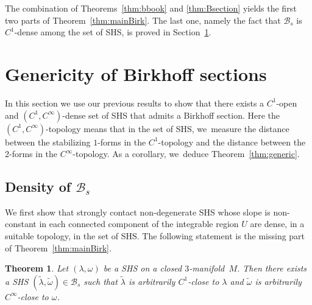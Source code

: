 \documentclass[JEP,XML,SOM,Unicode,NoEqCountersInSection,NoFloatCountersInSection,published]{cedram}
\newcommand{\threemanifold}{$3$\nobreakdash-mani\-fold\xspace}
\newtheorem{theorem}{Theorem}[section]
\theoremstyle{definition}
\begin{document}
The combination of Theorems~\ref{thm:bbook} and \ref{thm:Bsection} yields the first two parts of Theorem~\ref{thm:mainBirk}. The last one, namely the fact that $\mathcal{B}_s$ is $C^1$-dense among the set of SHS, is proved in Section~\ref{sec:gen}.\enlargethispage{.5\baselineskip}%

\section{Genericity of Birkhoff sections}\label{sec:gen}

In this section we use our previous results to show that there exists a $C^1$-open and $(C^1,C^\infty)$-dense set of SHS that admits a Birkhoff section. Here the $(C^1,C^\infty)$-topology means that in the set of SHS, we~measure the distance between the stabilizing $1$-forms in the $C^1$-topology and the distance between the 2-forms in the $C^\infty$-topology. As a corollary, we~deduce Theorem~\ref{thm:generic}.

\subsection{Density of $\mathcal{B}_s$
}\label{ss:density}

We first show that strongly contact non-degenerate SHS whose slope is non-constant in each connected component of the integrable region $U$ are dense, in a suitable topology, in the set of SHS. The following statement is the missing part of Theorem~\ref{thm:mainBirk}.

\begin{theorem}\label{thm:density}
Let $(\lambda,\omega)$ be a SHS on a closed \threemanifold~$M$. Then there exists a SHS $(\widetilde \lambda, \widetilde \omega) \in \mathcal{B}_s$ such that $\widetilde \lambda$ is arbitrarily $C^1$-close to $\lambda$ and $\widetilde \omega$ is arbitrarily $C^\infty$-close to $\omega$.
\end{theorem}
\end{document}
